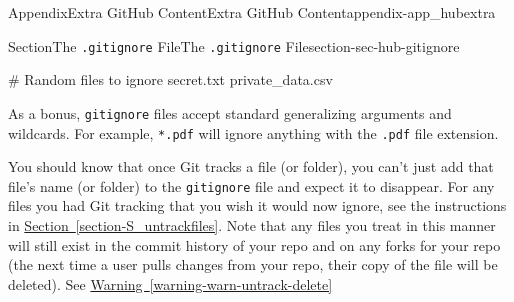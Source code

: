 \documentclass[oneside,10pt,]{book}
\newcommand{\xreffont}{\relax}
\newcommand{\mono}[1]{\texttt{#1}}
\begin{document}
\begin{appendixptx}{Appendix}{Extra GitHub Content}{}{Extra GitHub Content}{}{}{appendix-app_hubextra}
\begin{sectionptx}{Section}{The \mono{.gitignore} File}{}{The \mono{.gitignore} File}{}{}{section-sec-hub-gitignore}
\begin{codedisplay}
# Random files to ignore
secret.txt
private_data.csv
\end{codedisplay}
%
\par
As a bonus, \mono{gitignore} files accept standard generalizing arguments and wildcards. For example, \mono{*.pdf} will ignore anything with the \mono{.pdf} file extension.%
\par
You should know that once Git tracks a file (or folder), you can't just add that file's name (or folder) to the \mono{gitignore} file and expect it to disappear. For any files you had Git tracking that you wish it would now ignore, see the instructions in \hyperref[section-S_untrackfiles]{Section~{\xreffont\ref{section-S_untrackfiles}}}. Note that any files you treat in this manner will still exist in the commit history of your repo and on any forks for your repo (the next time a user pulls changes from your repo, their copy of the file will be deleted). See \hyperref[warning-warn-untrack-delete]{Warning~{\xreffont\ref{warning-warn-untrack-delete}}}%
\end{sectionptx}
\end{appendixptx}
%
%
\typeout{************************************************}
\typeout{************************************************}
%
\end{document}
